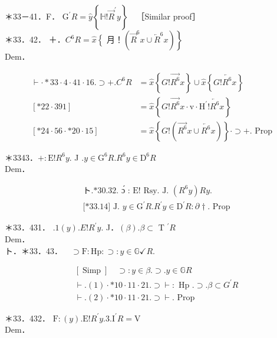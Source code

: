 \documentclass[10pt]{article}
\begin{document}
＊33－41．F． $\mathrm{G}^{\prime} R=\hat{y}\left\{\mathbb{H}!\vec{R}^{\prime} y\right\} \quad$［Similar proof］\\
＊33．42． ＋．$C^{6} R=\widehat{x}\left\{\right.$ 月！$\left.\left(\vec{R}^{6} x \cup \overleftarrow{R}^{6} x\right)\right\}$\\
Dem．

$$
\begin{aligned}
\vdash \cdot * 33 \cdot 4 \cdot 41 \cdot 16 . \supset+. C^{6} R & =\hat{x}\left\{G!\overrightarrow{R^{6}} x\right\} \cup \hat{x}\left\{G!\overleftarrow{R^{6}} x\right\} \\
{[* 22 \cdot 391] } & =\hat{x}\left\{G!\overrightarrow{R^{6}} x \cdot \mathrm{v} \cdot \mathrm{H}^{\prime}!\overleftarrow{R^{6}} x\right\} \\
{[* 24 \cdot 56 \cdot * 20 \cdot 15] } & =\hat{x}\left\{G!\left(\overrightarrow{R^{6}} x \cup \overleftarrow{R^{6}} x\right)\right\} \cdot \supset+. \text { Prop }
\end{aligned}
$$

＊3343．$+: \mathrm{E}!R^{6} y$. J $. y \in \mathrm{G}^{6} R . R^{6} y \in \mathrm{D}^{6} R$\\
Dem．

$$
\begin{aligned}
& \text { ト.*30.32. ɔ́ : E! Rsy. J. }\left(R^{6} y\right) R y \text {. } \\
& \text { [*33.14] J. } y \in \mathrm{G}^{\prime} R . R^{\prime} y \in \mathrm{D}^{\prime} R: \partial \dagger \text {. Prop }
\end{aligned}
$$

＊33．431． $.1(y) . E!R^{\prime} y$. J．$(\beta) . \beta \subset$ T $^{\prime} R$\\
Dem．\\
ト．＊33．43．$\quad \supset \mathrm{F}: \mathrm{Hp}: \supset: y \in \mathbb{G} \checkmark R$.


\begin{align*}
& {[\operatorname{Simp}] \quad \supset: y \in \beta . \supset . y \in \mathbb{G} R}  \tag{1}\\
& \vdash .(1) \cdot * 10 \cdot 11 \cdot 21 . \supset \vdash: \text { Hp } . \supset . \beta \subset G^{\prime} R  \tag{2}\\
& \vdash .(2) \cdot * 10 \cdot 11 \cdot 21 . \supset \vdash . \text { Prop }
\end{align*}


＊33．432． $\mathrm{F}:(y) . \mathrm{E}!R^{\prime} y .3 . \mathrm{I}^{\prime} R=\mathrm{V}$\\
Dem．
\end{document}
